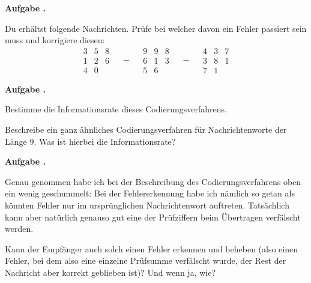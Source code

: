 \documentclass[a4paper,ngerman,12pt]{scrartcl}
\theoremstyle{definition}
\theoremstyle{plain}
\theoremstyle{remark}
\newlength{\aufgabenskip}
\newcounter{aufgabennummer}
\newenvironment{aufgabe}[1]{
	\addtocounter{aufgabennummer}{1}
	\textbf{Aufgabe \theaufgabennummer.} \emph{#1} \par
}{\vspace{\aufgabenskip}}
\begin{document}
\begin{aufgabe}{}
	Du erhältst folgende Nachrichten. Prüfe bei welcher davon ein Fehler passiert sein muss und korrigiere diesen:
		\[\begin{array}{ccc}3 & 5 & 8\\1 & 2 & 6 \\ 4 & 0 &\end{array} \quad-\quad \begin{array}{ccc}9 & 9 & 8\\6 & 1 & 3 \\ 5 & 6 &\end{array} \quad-\quad \begin{array}{ccc}4 & 3 & 7\\3 & 8 & 1 \\ 7 & 1 &\end{array}\]
\end{aufgabe}

\begin{aufgabe}{}
	Bestimme die Informationsrate dieses Codierungsverfahrens.
	
	Beschreibe ein ganz ähnliches Codierungsverfahren für Nachrichtenworte der Länge $9$. Was ist hierbei die Informationsrate?
\end{aufgabe}

\begin{aufgabe}{}
	Genau genommen habe ich bei der Beschreibung des Codierungsverfahrens oben ein wenig geschummelt: Bei der Fehlererkennung habe ich nämlich so getan als könnten Fehler nur im ursprünglichen Nachrichtenwort auftreten. Tatsächlich kann aber natürlich genauso gut eine der Prüfziffern beim Übertragen verfälscht werden. 
	
	Kann der Empfänger auch solch einen Fehler erkennen und beheben (also einen Fehler, bei dem also eine einzelne Prüfsumme verfälscht wurde, der Rest der Nachricht aber korrekt geblieben ist)? Und wenn ja, wie?
\end{aufgabe}
\end{document}
